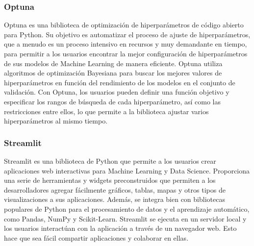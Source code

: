 \subsubsection{Optuna}
Optuna\cite{optuna_2019} es una biblioteca de optimización de hiperparámetros de código abierto para Python. Su objetivo 
es automatizar el proceso de ajuste de hiperparámetros, que a menudo es un proceso intensivo en 
recursos y muy demandante en tiempo, para permitir a los usuarios encontrar la mejor configuración 
de hiperparámetros de sus modelos de Machine Learning de manera eficiente. Optuna utiliza algoritmos 
de optimización Bayesiana\cite{Ye_2020} para buscar los mejores valores de hiperparámetros en función del 
rendimiento de los modelos en el conjunto de validación. Con Optuna, los usuarios pueden definir una función 
objetivo y especificar los rangos de búsqueda de cada hiperparámetro, así como las restricciones entre ellos, 
lo que permite a la biblioteca ajustar varios hiperparámetros al mismo tiempo.

\subsubsection{Streamlit}
Streamlit\cite{Streamlit} es una biblioteca de Python que permite a los usuarios crear aplicaciones web interactivas
para Machine Learning y Data Science. Proporciona una serie de herramientas y widgets preconstruidos 
que permiten a los desarrolladores agregar fácilmente gráficos, tablas, mapas y otros tipos de 
visualizaciones a sus aplicaciones. Además, se integra bien con bibliotecas populares de Python 
para el procesamiento de datos y el aprendizaje automático, como Pandas, NumPy y Scikit-Learn\cite{scikit-learn}.
Streamlit se ejecuta en un servidor local y los usuarios interactúan con la aplicación a través 
de un navegador web. Esto hace que sea fácil compartir aplicaciones y colaborar en ellas.